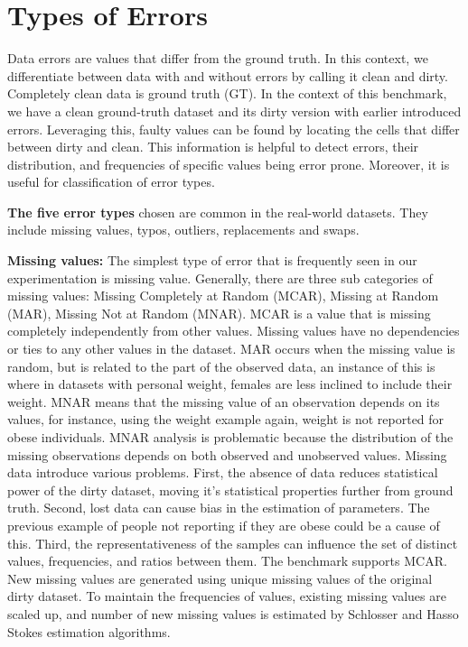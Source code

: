 \section{Types of Errors}
\label{sec:error_types}

Data errors are values that differ from the ground truth.
In this context, we differentiate between data with and without errors by calling it clean and dirty. 
Completely clean data is ground truth (GT).  
In the context of this benchmark, we have a clean ground-truth dataset and its dirty version with earlier introduced errors.  
Leveraging this, faulty values can be found by locating the cells that differ between dirty and clean. 
This information is helpful to detect errors, their distribution, and frequencies of specific values being error prone.  
Moreover, it is useful for classification of error types.

\textbf{The five error types} chosen are common in the real-world datasets. They include missing values, typos, outliers, replacements and swaps. 

\textbf{Missing values:} 
The simplest type of error that is frequently seen in our experimentation is missing value. 
Generally, there are three sub categories of missing values: 
Missing Completely at Random (MCAR), Missing at Random (MAR), Missing Not at Random (MNAR). 
MCAR is a value that is missing completely independently from other values. 
Missing values have no dependencies or ties to any other values in the dataset. 
MAR occurs when the missing value is random, but is related to the part of the observed data, an instance of this is where in datasets with personal weight, females are less inclined to include their weight. 
MNAR means that the missing value of an observation depends on its values, for instance, using the weight example again, weight is not reported for obese individuals.
MNAR analysis is problematic because the distribution of the missing observations depends on both observed and unobserved values.
Missing data introduce various problems. 
First, the absence of data reduces statistical power of the dirty dataset, moving it's statistical properties further from ground truth.
Second, lost data can cause bias in the estimation of parameters. The previous example of people not reporting if they are obese could be a cause of this. 
Third, the representativeness of the samples can influence the set of distinct values, frequencies, and ratios between them.
The benchmark supports MCAR. 
New missing values are generated using unique missing values of the original dirty dataset. 
To maintain the frequencies of values, existing missing values are scaled up, and number of new missing values is estimated by Schlosser \cite{HassNSS1995} and Hasso Stokes \cite{HassS1998} estimation algorithms.

